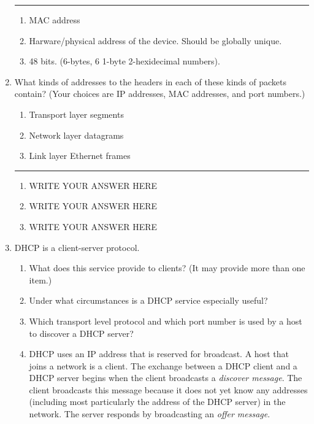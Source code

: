 \documentclass[twoside]{article}
\newenvironment{answer}
  {\vspace*{0.2cm} \rule{12cm}{0.04cm} \vspace*{0.2cm}}
  {\vspace*{0.2cm}}
\begin{document}
\begin{enumerate}
  \begin{answer}

  \begin{enumerate}
    \item MAC address
    \item Harware/physical address of the device.  Should be globally unique.
    \item 48 bits.  (6-bytes, 6 1-byte 2-hexidecimal numbers). 
    \end{enumerate}

    \end{answer}

  \item What kinds of addresses to the headers in each of these kinds
      of packets contain? (Your choices are IP addresses, MAC addresses,
      and port numbers.)
  \begin{enumerate}
    \item Transport layer segments
    \item Network layer datagrams
    \item Link layer Ethernet frames
    \end{enumerate}

  \begin{answer}

  \begin{enumerate}
    \item WRITE YOUR ANSWER HERE
    \item WRITE YOUR ANSWER HERE
    \item WRITE YOUR ANSWER HERE
    \end{enumerate}

    \end{answer}

  \item DHCP is a client-server protocol.
  \begin{enumerate}
    \item What does this service provide to clients? (It may provide more than one item.) 
    \item Under what circumstances is a DHCP service especially useful?
    \item Which transport level protocol and which port number is used by
      a host to discover a DHCP server?
    \item DHCP uses an IP address that is reserved for broadcast. 
      A host that joins a network is a client.
      The exchange between a DHCP client and a DHCP server begins when
      the client broadcasts a \emph{discover message}.
      The client broadcasts this message because it does not yet know
      any addresses (including most particularly the address of the DHCP
      server) in the network.
      The server responds by broadcasting an \emph{offer message}.


\end{enumerate}
\end{enumerate}
\end{document}
